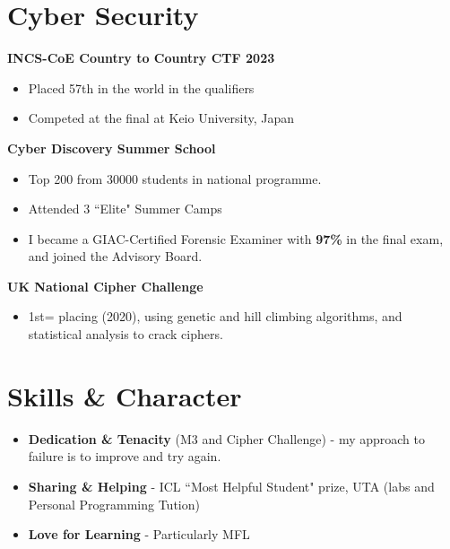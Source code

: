 \documentclass{Resume}
\begin{document}
    \section{Cyber Security}
            \textbf{INCS-CoE Country to Country CTF 2023}
            \begin{itemize}
                \item Placed 57th in the world in the qualifiers
                \item Competed at the final at Keio University, Japan
            \end{itemize}
		\textbf{Cyber Discovery Summer School}
				\begin{itemize}
				    \item Top 200 from 30000 students in national programme.
				    \item Attended 3 ``Elite" Summer Camps
				    \item I became a GIAC-Certified Forensic Examiner with \textbf{97\%} in the final exam, and joined the Advisory Board.
				\end{itemize}
            \textbf{UK National Cipher Challenge}
		  \begin{itemize}
                \item 1st= placing (2020), using genetic and hill climbing algorithms, and statistical analysis to crack ciphers.
            \end{itemize}
            
    \section{Skills \& Character}
        \begin{itemize}
            \item \textbf{Dedication \& Tenacity} (M3 and Cipher Challenge) - my approach to failure is to improve and try again.
            \item \textbf{Sharing \& Helping} - ICL ``Most Helpful Student" prize, UTA (labs and Personal Programming Tution)
            \item \textbf{Love for Learning} - Particularly MFL
        \end{itemize}
        
\end{document}
